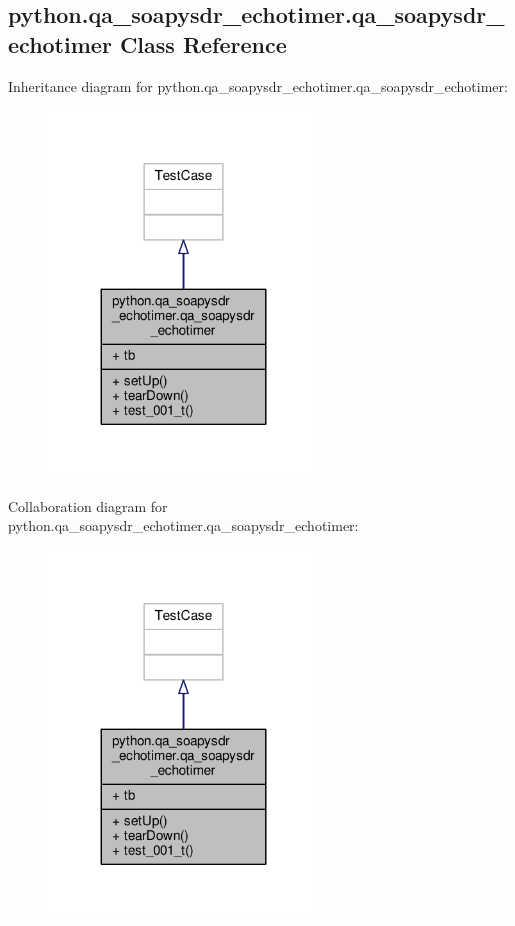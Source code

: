 \subsection{python.\+qa\+\_\+soapysdr\+\_\+echotimer.\+qa\+\_\+soapysdr\+\_\+echotimer Class Reference}
\label{classpython_1_1qa__soapysdr__echotimer_1_1qa__soapysdr__echotimer}


Inheritance diagram for python.\+qa\+\_\+soapysdr\+\_\+echotimer.\+qa\+\_\+soapysdr\+\_\+echotimer\+:
\nopagebreak
\begin{figure}[H]
\begin{center}
\leavevmode
\includegraphics[width=203pt]{d3/dac/classpython_1_1qa__soapysdr__echotimer_1_1qa__soapysdr__echotimer__inherit__graph}
\end{center}
\end{figure}


Collaboration diagram for python.\+qa\+\_\+soapysdr\+\_\+echotimer.\+qa\+\_\+soapysdr\+\_\+echotimer\+:
\nopagebreak
\begin{figure}[H]
\begin{center}
\leavevmode
\includegraphics[width=203pt]{de/d8a/classpython_1_1qa__soapysdr__echotimer_1_1qa__soapysdr__echotimer__coll__graph}
\end{center}
\end{figure}
